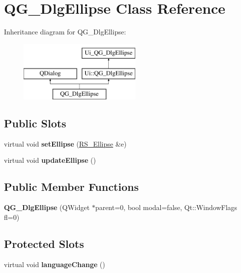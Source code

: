 \hypertarget{classQG__DlgEllipse}{\section{Q\-G\-\_\-\-Dlg\-Ellipse Class Reference}
\label{classQG__DlgEllipse}
}
Inheritance diagram for Q\-G\-\_\-\-Dlg\-Ellipse\-:\begin{figure}[H]
\begin{center}
\leavevmode
\includegraphics[height=3.000000cm]{classQG__DlgEllipse}
\end{center}
\end{figure}
\subsection*{Public Slots}
\begin{DoxyCompactItemize}
\item 
\hypertarget{classQG__DlgEllipse_a6c93196df44cd320ad6e7abeda1bddc2}{virtual void {\bfseries set\-Ellipse} (\hyperlink{classRS__Ellipse}{R\-S\-\_\-\-Ellipse} \&e)}\label{classQG__DlgEllipse_a6c93196df44cd320ad6e7abeda1bddc2}

\item 
\hypertarget{classQG__DlgEllipse_a619483ea9a69ec24846433376fddd122}{virtual void {\bfseries update\-Ellipse} ()}\label{classQG__DlgEllipse_a619483ea9a69ec24846433376fddd122}

\end{DoxyCompactItemize}
\subsection*{Public Member Functions}
\begin{DoxyCompactItemize}
\item 
\hypertarget{classQG__DlgEllipse_abe12ae578c45ee12d3c225a3f86b8de8}{{\bfseries Q\-G\-\_\-\-Dlg\-Ellipse} (Q\-Widget $\ast$parent=0, bool modal=false, Qt\-::\-Window\-Flags fl=0)}\label{classQG__DlgEllipse_abe12ae578c45ee12d3c225a3f86b8de8}

\end{DoxyCompactItemize}
\subsection*{Protected Slots}
\begin{DoxyCompactItemize}
\item 
\hypertarget{classQG__DlgEllipse_a077935f6be6427d73528849846d6629e}{virtual void {\bfseries language\-Change} ()}\label{classQG__DlgEllipse_a077935f6be6427d73528849846d6629e}

\end{DoxyCompactItemize}
